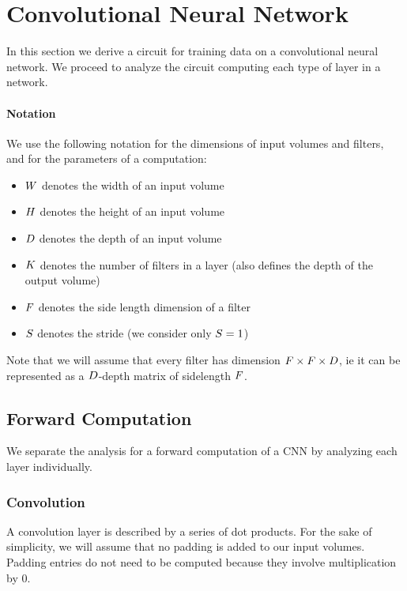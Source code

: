 
\section{Convolutional Neural Network}

In this section we derive a circuit for training data on a convolutional neural network.
We proceed to analyze the circuit computing each type of layer in a network.

\paragraph{Notation}
We use the following notation for the dimensions of input volumes and filters, and for the parameters of a computation:
\begin{itemize}
	\item $W$ denotes the width of an input volume
	\item $H$ denotes the height of an input volume
	\item $D$ denotes the depth of an input volume
	\item $K$ denotes the number of filters in a layer (also defines the depth of the output volume)
	\item $F$ denotes the side length dimension of a filter
	\item $S$ denotes the stride (we consider only $S=1$)
\end{itemize}

Note that we will assume that every filter has dimension $F \times F \times D$, ie it can be represented as a $D$-depth matrix of sidelength $F$.

\subsection{Forward Computation}

We separate the analysis for a forward computation of a CNN by analyzing each layer individually.

\subsubsection{Convolution}
A convolution layer is described by a series of dot products.
For the sake of simplicity, we will assume that no padding is added to our input volumes. Padding entries do not need to be computed because they involve multiplication by 0.



